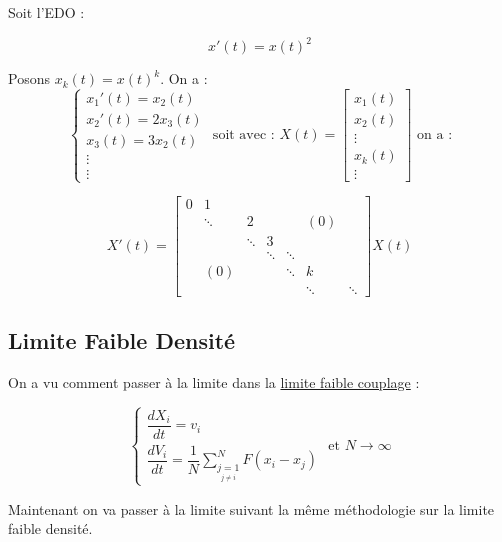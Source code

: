 \documentclass[12pt,a4paper]{article}
\begin{document}
	\hspace{-.8cm}
	
	\begin{ex}
		Soit l'EDO :
		
		\[x'(t) = x(t)^2\]
		
		Posons $x_k(t) = x(t)^k$. On a :
		\[\begin{cases}
			x_1'(t) = x_2(t)\\
			x_2'(t) = 2x_3(t)\\
			x_3(t) = 3 x_2(t)\\
			\vdots\\
			\vdots
		\end{cases} \text{ soit avec : } X(t) = \left[\begin{matrix}
		x_1(t)\\
		x_2(t)\\
		\vdots\\
		x_k(t)\\
		\vdots
		\end{matrix}\right] \text{ on a :}\] 
		
		\[X'(t) = \left[\begin{matrix}
			0 & 1 & & & & & \\
			& \ddots & 2 & & & (0) & \\
			& & \ddots & 3 & & & \\
			& & & \ddots & \ddots & & \\
			&  (0)& & & \ddots & k & \\
			& & & & & \ddots & \ddots
		\end{matrix}\right] X(t)\]
	\end{ex}
	
	\newpage
	
	\subsection{Limite Faible Densité}
	
	On a vu comment passer à la limite dans la \underline{limite faible couplage} :
	
	\[\begin{cases}
		\dfrac{dX_i}{dt} = v_i\\
		\dfrac{dV_i}{dt} = \dfrac{1}{N}\displaystyle\sum_{\underset{j\not=i}{j=1}}^N F(x_i-x_j)
	\end{cases}\text{ et } N\to\infty\]
	
	Maintenant on va passer à la limite suivant la même méthodologie sur la limite faible densité.\\
	
\end{document}
